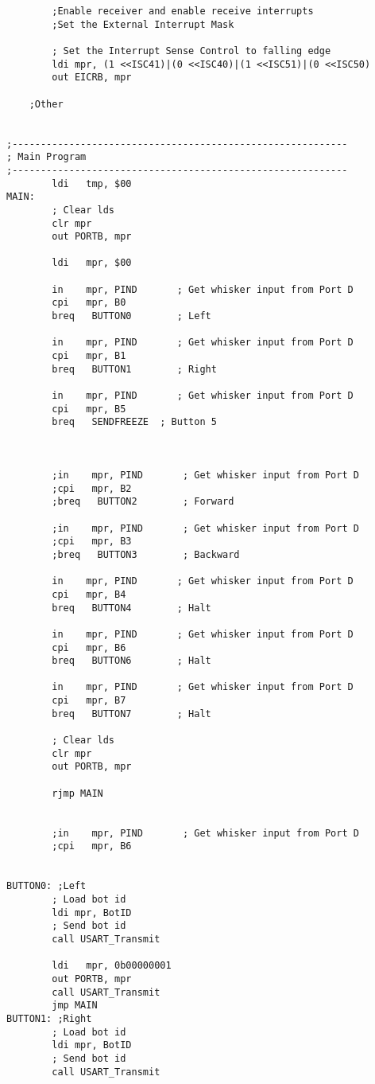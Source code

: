 \documentclass[12pt,letterpaper]{article}
\begin{document}
\begin{verbatim}
		;Enable receiver and enable receive interrupts
		;Set the External Interrupt Mask

        ; Set the Interrupt Sense Control to falling edge
        ldi mpr, (1 <<ISC41)|(0 <<ISC40)|(1 <<ISC51)|(0 <<ISC50)
        out EICRB, mpr

	;Other


;-----------------------------------------------------------
; Main Program
;-----------------------------------------------------------
        ldi   tmp, $00
MAIN:
        ; Clear lds
        clr mpr
        out PORTB, mpr

        ldi   mpr, $00

        in    mpr, PIND       ; Get whisker input from Port D
        cpi   mpr, B0
        breq   BUTTON0        ; Left

        in    mpr, PIND       ; Get whisker input from Port D
        cpi   mpr, B1
        breq   BUTTON1        ; Right

        in    mpr, PIND       ; Get whisker input from Port D
        cpi   mpr, B5
        breq   SENDFREEZE  ; Button 5



        ;in    mpr, PIND       ; Get whisker input from Port D
        ;cpi   mpr, B2
        ;breq   BUTTON2        ; Forward

        ;in    mpr, PIND       ; Get whisker input from Port D
        ;cpi   mpr, B3
        ;breq   BUTTON3        ; Backward

        in    mpr, PIND       ; Get whisker input from Port D
        cpi   mpr, B4
        breq   BUTTON4        ; Halt

        in    mpr, PIND       ; Get whisker input from Port D
        cpi   mpr, B6
        breq   BUTTON6        ; Halt

        in    mpr, PIND       ; Get whisker input from Port D
        cpi   mpr, B7
        breq   BUTTON7        ; Halt

        ; Clear lds
        clr mpr
        out PORTB, mpr

        rjmp MAIN


        ;in    mpr, PIND       ; Get whisker input from Port D
        ;cpi   mpr, B6


BUTTON0: ;Left
        ; Load bot id
        ldi mpr, BotID
        ; Send bot id
        call USART_Transmit

        ldi   mpr, 0b00000001
        out PORTB, mpr
        call USART_Transmit
        jmp MAIN
BUTTON1: ;Right
        ; Load bot id
        ldi mpr, BotID
        ; Send bot id
        call USART_Transmit


\end{verbatim}
\end{document}
